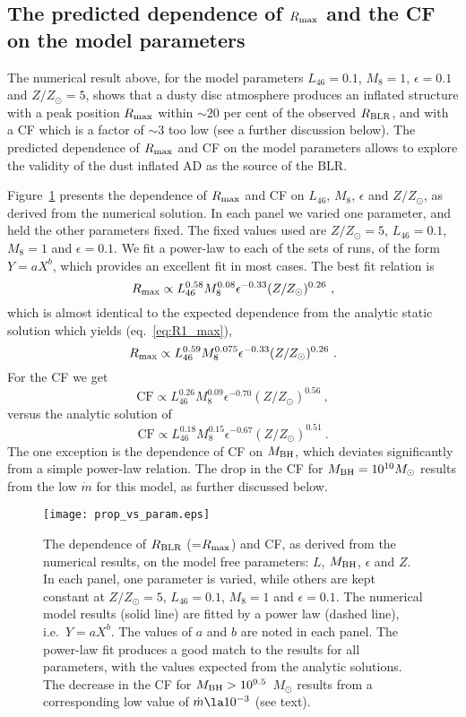 \documentclass[a4paper,fleqn,usenatbib]{mnras}
\newcommand{\Mbh}{\mbox{$M_{\rm BH}$}}
\begin{document}
\subsection{The predicted dependence of $R_{\rm max}$ and the CF on the model parameters}

The numerical result above, for the model parameters $L_{46}=0.1$, $M_8=1$, $\epsilon=0.1$ and $Z/Z_{\odot}=5$,
shows that a dusty disc atmosphere produces an inflated structure with a peak position $R_{\rm max}$ within 
$\sim 20$ per cent of the observed $R_{\rm BLR}$, and with a CF which is a factor of $\sim 3$ too low (see a further discussion below). The predicted dependence of
$R_{\rm max}$ and CF on the model parameters allows to explore the validity of the dust inflated AD as
the source of the BLR. 

Figure~\ref{fig:prop_vs_param} presents the dependence of $R_{\rm max}$ and CF on
$L_{46}$, $M_8$, $\epsilon$ and $Z/Z_{\odot}$, as derived from the numerical solution. In each panel we varied
one parameter, and held the other parameters fixed. The fixed values used are $Z/Z_{\odot}=5$, 
$L_{46}=0.1$, $M_8=1$ and $\epsilon=0.1$. We fit a power-law to each of the sets of runs, of the
form $Y=aX^b$, which provides an excellent fit in most cases. 
The best fit relation is
\begin{equation}
R_{\rm max}\propto L_{46}^{0.58} M_8^{0.08} \epsilon^{-0.33} (Z/Z_{\odot})^{0.26}\ ,
\end{equation}
which is almost identical to the expected dependence from the analytic static solution which yields 
(eq.~\ref{eq:R1_max}), 
\[
R_{\rm max}\propto L_{46}^{0.59} M_8^{0.075} \epsilon^{-0.33} (Z/Z_{\odot})^{0.26}\ .
\]
For the CF we get
\begin{equation}
\mbox{CF}\propto L_{46}^{0.26} M_8^{0.09} \epsilon^{-0.70} (Z/Z_{\odot})^{0.56}\ , \label{eq:CF2}
\end{equation}
versus the analytic solution of
\[
\mbox{CF}\propto L_{46}^{0.18} M_8^{0.15} \epsilon^{-0.67} (Z/Z_{\odot})^{0.51}\ .
\]
The one exception is the dependence of CF on $M_{\rm BH}$, which deviates
significantly from a simple power-law relation. The drop in the CF for $M_{\rm BH}=10^{10}M_{\odot}$ results
from the low $\dot{m}$ for this model, as further discussed below.


\begin{figure*}
\texttt{[image: prop\_vs\_param.eps]}
\caption{The dependence of $R_{\rm BLR}$ (=$R_{\rm max}$) and CF, as derived from the numerical results,
on the model free parameters: $L$, $M_{\rm BH}$,
$\epsilon$ and $Z$. In each panel, one parameter is varied, while others are kept constant at $Z/Z_{\odot}=5$, 
$L_{46}=0.1$, $M_8=1$ and $\epsilon=0.1$. The numerical model results (solid line) are fitted by a power law (dashed line), i.e.\ $Y=aX^b$. The values of $a$ and $b$ are noted in each panel. The power-law fit produces a good match to the results for all parameters, with the values expected from the analytic solutions. The decrease in the CF for 
$\Mbh>10^{9.5}$~$M_{\odot}$ results from a corresponding low value of $\dot{m}\la 10^{-3}$ (see text).}
\label{fig:prop_vs_param}
\end{figure*}
\end{document}

